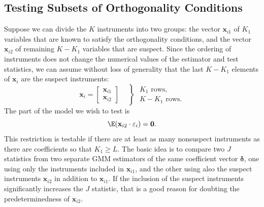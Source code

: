 \subsection*{Testing Subsets of Orthogonality Conditions}

Suppose we can divide the $K$ instruments into two groups: the vector $\mathbf{x}_{i1}$ of $K_1$
variables that are known to satisfy the orthogonality conditions, and the vector
$\mathbf{x}_{i2}$ of remaining $K - K_1$ variables that are suspect.  Since the ordering of instruments
does not change the numerical values of the estimator and test statistics, we can
assume without loss of generality that the last $K - K_1$ elements of $\mathbf{x}_i$ are the suspect
instruments:
\begin{equation}
  \mathbf{x}_i = \begin{bmatrix} \mathbf{x}_{i1} \\ \mathbf{x}_{i2} \end{bmatrix}
  \quad
  \left\}
  \begin{array}{l} K_1 \text{ rows,} \\ K - K_1 \text{ rows.} \end{array}
  \right.
  \label{eq:3.6.3}
\end{equation}
The part of the model we wish to test is
\begin{equation}
  \E(\mathbf{x}_{i2} \cdot \varepsilon_i) = \mathbf{0}.
  \label{eq:3.6.4}
\end{equation}
This restriction is testable if there are at least as many nonsuspect instruments as
there are coefficients so that $K_1 \geq L$.  The basic idea is to compare two $J$ statistics
from two separate GMM estimators of the same coefficient vector $\boldsymbol{\delta}$, one using only
the instruments included in $\mathbf{x}_{i1}$, and the other using also the suspect instruments
$\mathbf{x}_{i2}$ in addition to $\mathbf{x}_{i1}$.  If the inclusion of the suspect instruments significantly
increases the $J$ statistic, that is a good reason for doubting the predeterminedness of
$\mathbf{x}_{i2}$.

